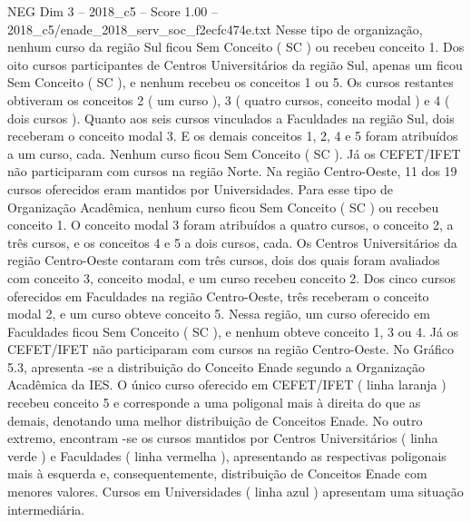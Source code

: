 \begin{textsample}{NEG Dim 3 – 2018\_c5 – Score 1.00 – 2018\_c5/enade\_2018\_serv\_soc\_f2ecfc474e.txt}
Nesse tipo de organização, nenhum curso da região Sul ficou Sem Conceito ( SC ) ou recebeu conceito 1.
Dos oito cursos participantes de Centros Universitários da região Sul, apenas um ficou Sem Conceito ( SC ), e nenhum recebeu os conceitos 1 ou 5.
Os cursos restantes obtiveram os conceitos 2 ( um curso ), 3 ( quatro cursos, conceito modal ) e 4 ( dois cursos ).
Quanto aos seis cursos vinculados a Faculdades na região Sul, dois receberam o conceito modal 3.
E os demais conceitos 1, 2, 4 e 5 foram atribuídos a um curso, cada.
Nenhum curso ficou Sem Conceito ( SC ).
Já os CEFET/IFET não participaram com cursos na região Norte.
Na região Centro-Oeste, 11 dos 19 cursos oferecidos eram mantidos por Universidades.
Para esse tipo de Organização Acadêmica, nenhum curso ficou Sem Conceito ( SC ) ou recebeu conceito 1.
O conceito modal 3 foram atribuídos a quatro cursos, o conceito 2, a três cursos, e os conceitos 4 e 5 a dois cursos, cada.
Os Centros Universitários da região Centro-Oeste contaram com três cursos, dois dos quais foram avaliados com conceito 3, conceito modal, e um curso recebeu conceito 2.
Dos cinco cursos oferecidos em Faculdades na região Centro-Oeste, três receberam o conceito modal 2, e um curso obteve conceito 5.
Nessa região, um curso oferecido em Faculdades ficou Sem Conceito ( SC ), e nenhum obteve conceito 1, 3 ou 4.
Já os CEFET/IFET não participaram com cursos na região Centro-Oeste.
No Gráfico 5.3, apresenta -se a distribuição do Conceito Enade segundo a Organização Acadêmica da IES.
O único curso oferecido em CEFET/IFET ( linha laranja ) recebeu conceito 5 e corresponde a uma poligonal mais à direita do que as demais, denotando uma melhor distribuição de Conceitos Enade.
No outro extremo, encontram -se os cursos mantidos por Centros Universitários ( linha verde ) e Faculdades ( linha vermelha ), apresentando as respectivas poligonais mais à esquerda e, consequentemente, distribuição de Conceitos Enade com menores valores.
Cursos em Universidades ( linha azul ) apresentam uma situação intermediária.

\end{textsample}
